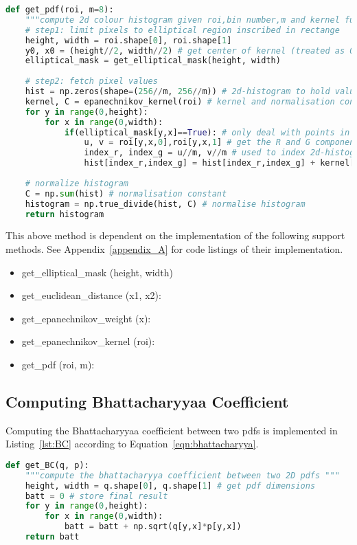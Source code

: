 \begin{lstlisting}[language=Python, caption={Computing pdf}, captionpos=b, label={lst:pdf}]
def get_pdf(roi, m=8):
    """compute 2d colour histogram given roi,bin number,m and kernel function"""
    # step1: limit pixels to elliptical region inscribed in rectange
    height, width = roi.shape[0], roi.shape[1]
    y0, x0 = (height//2, width//2) # get center of kernel (treated as 0,0) - note these are also hy and hx 
    elliptical_mask = get_elliptical_mask(height, width)
       
    # step2: fetch pixel values
    hist = np.zeros(shape=(256//m, 256//m)) # 2d-histogram to hold values 
    kernel, C = epanechnikov_kernel(roi) # kernel and normalisation constant, C
    for y in range(0,height):
        for x in range(0,width): 
            if(elliptical_mask[y,x]==True): # only deal with points in the mask
                u, v = roi[y,x,0],roi[y,x,1] # get the R and G components
                index_r, index_g = u//m, v//m # used to index 2d-histogram
                hist[index_r,index_g] = hist[index_r,index_g] + kernel[y,x] # add point to histogram with weight
    
    # normalize histogram
    C = np.sum(hist) # normalisation constant
    histogram = np.true_divide(hist, C) # normalise histogram
    return histogram
\end{lstlisting}

This above method is dependent on the implementation of the following support
methods. See Appendix~\ref{appendix_A} for code listings of their implementation.
\begin{itemize}
    \item get\_elliptical\_mask (height, width)
    \item get\_euclidean\_distance (x1, x2):
    \item get\_epanechnikov\_weight (x):
    \item get\_epanechnikov\_kernel (roi):
    \item get\_pdf (roi, m):
\end{itemize}

\subsection{Computing Bhattacharyyaa Coefficient}
Computing the Bhattacharyyaa coefficient between two pdfs is implemented in
Listing~\ref{lst:BC} according to Equation~\ref{eqn:bhattacharyya}. 

\begin{lstlisting}[language=Python, caption={Computing Bhattacharyya Coefficient}, captionpos=b, label={lst:BC}]
def get_BC(q, p):
    """compute the bhattacharyya coefficient between two 2D pdfs """
    height, width = q.shape[0], q.shape[1] # get pdf dimensions
    batt = 0 # store final result
    for y in range(0,height):
        for x in range(0,width):
            batt = batt + np.sqrt(q[y,x]*p[y,x])
    return batt
\end{lstlisting}

